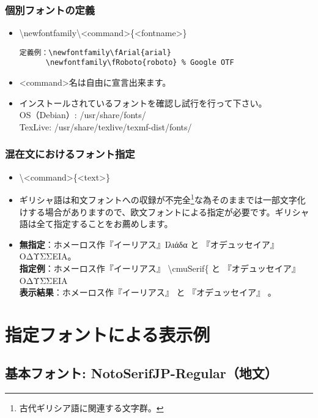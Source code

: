 \documentclass[a4paper,10pt]{ltjsarticle}
\def\colH#1{\color[HTML]{#1}}
\begin{document}
\subsubsection{個別フォントの定義}
\begin{itemize}
  \item[] {\colH{800000} \textbackslash newfontfamily\textbackslash<command>\{<fontname>\}}
\vspace{-2mm}
\begin{verbatim}
定義例：\newfontfamily\fArial{arial}
      \newfontfamily\fRoboto{roboto} % Google OTF
\end{verbatim} 
\vspace{-2mm}
  \item <command>名は自由に宣言出来ます。  
  \item インストールされているフォントを確認し試行を行って下さい。\\
OS（Debian）: /usr/share/fonts/\\
TexLive: /usr/share/texlive/texmf-dist/fonts/\vspace{-2mm}
\end{itemize}

\subsubsection{混在文におけるフォント指定}
\begin{itemize}
  \item[] {\colH{800000} \textbackslash <command>\{<text>\}}
    \item ギリシャ語は和文フォントへの収録が不完全\footnote{古代ギリシア語に関連する文字群。}な為そのままでは一部文字化けする場合がありますので、欧文フォントによる指定が必要です。ギリシャ語は全て指定することをお薦めします。
  \item[] 
  \textbf{無指定}：ホメーロス作『イーリアス』Ιλι{\colH{800000}ά}δα と 『オデュッセイア』ΟΔΥΣΣΕΙΑ。\\
  \textbf{指定例}：ホメーロス作『イーリアス』 {\colH{800000}\textbackslash cmuSerif\{}\cmuSerif{Ιλιάδα}{\colH{800000}\}} と 『オデュッセイア』ΟΔΥΣΣΕΙΑ\\
  \textbf{表示結果}：ホメーロス作『イーリアス』 と 『オデュッセイア』 。
\end{itemize}

\section{指定フォントによる表示例}
\subsection{基本フォント: \textcolor{rred}{NotoSerifJP-Regular}（地文）}
\end{document}
